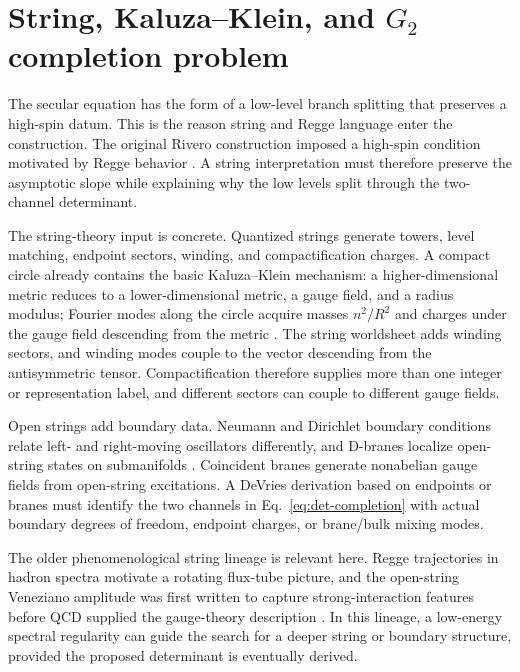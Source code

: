 \section{String, Kaluza--Klein, and \texorpdfstring{$G_2$}{G2} completion problem}
\label{sec:string-kk-g2}

The secular equation has the form of a low-level branch splitting that preserves a high-spin datum.  This is the reason string and Regge language enter the construction.  The original Rivero construction imposed a high-spin condition motivated by Regge behavior \cite{Rivero2006}.  A string interpretation must therefore preserve the asymptotic slope while explaining why the low levels split through the two-channel determinant.

The string-theory input is concrete.  Quantized strings generate towers, level matching, endpoint sectors, winding, and compactification charges.  A compact circle already contains the basic Kaluza--Klein mechanism: a higher-dimensional metric reduces to a lower-dimensional metric, a gauge field, and a radius modulus; Fourier modes along the circle acquire masses \(n^2/R^2\) and charges under the gauge field descending from the metric \cite{TongString}.  The string worldsheet adds winding sectors, and winding modes couple to the vector descending from the antisymmetric tensor.  Compactification therefore supplies more than one integer or representation label, and different sectors can couple to different gauge fields.

Open strings add boundary data.  Neumann and Dirichlet boundary conditions relate left- and right-moving oscillators differently, and D-branes localize open-string states on submanifolds \cite{TongString}.  Coincident branes generate nonabelian gauge fields from open-string excitations.  A DeVries derivation based on endpoints or branes must identify the two channels in Eq.~\eqref{eq:det-completion} with actual boundary degrees of freedom, endpoint charges, or brane/bulk mixing modes.

The older phenomenological string lineage is relevant here.  Regge trajectories in hadron spectra motivate a rotating flux-tube picture, and the open-string Veneziano amplitude was first written to capture strong-interaction features before QCD supplied the gauge-theory description \cite{TongString}.  In this lineage, a low-energy spectral regularity can guide the search for a deeper string or boundary structure, provided the proposed determinant is eventually derived.

